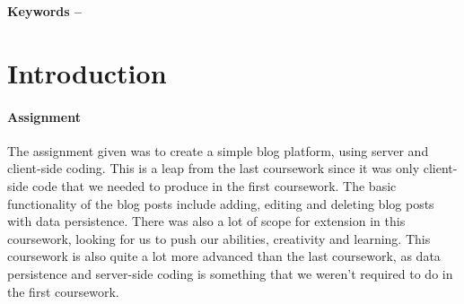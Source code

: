 \documentclass[10pt, a4paper]{article}
\title{\mytitle}
\author{\myauthor\hspace{1em}\\\contact\\Edinburgh Napier University\hspace{0.5em}-\hspace{0.5em}\mymodule}
\date{}
\begin{document}
    \maketitle
    \begin{abstract}
\paragraph{Coursework Brief}
The coursework given was designed to show that we had acquired a number of skills over the term of the course: an understanding of the World Wide Web, a solid understanding of web page development, an accrual of skills working with different web authoring tools and languages and the ability to combine a set of web pages and a web server to produce a working product.

\paragraph{Report Summary} 
The report below is designed to describe the process I took from starting the project to the end product, and an analysis of each of the stages. It will also look to provide details of the learning process undertaken throughout the entire project. The coursework files will be in the same private repository with the report I have produced. The website has been produced specifically for the coursework project and is not planned to be used in any later applications. The report and coursework have only been shared with Simon Wells and myself at the time of writing.
    \end{abstract}
    
    \textbf{Keywords -- }{\mykeywords}
    
	\section{Introduction}
	\paragraph{Assignment}
The assignment given was to create a simple blog platform, using server and client-side coding. This is a leap from the last coursework since it was only client-side code that we needed to produce in the first coursework. The basic functionality of the blog posts include adding, editing and deleting blog posts with data persistence. There was also a lot of scope for extension in this coursework, looking for us to push our abilities, creativity and learning. This coursework is also quite a lot more advanced than the last coursework, as data persistence and server-side coding is something that we weren't required to do in the first coursework.
\end{document}
